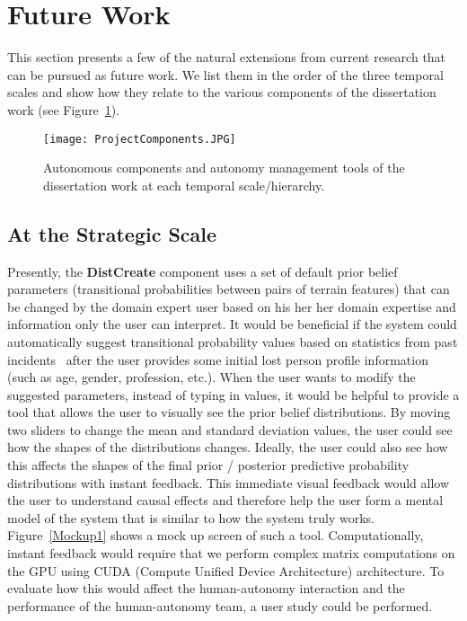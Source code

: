 \section{Future Work}
\label{futurework}

This section presents a few of the natural extensions from current research that can be pursued as future work. We list them in the order of the three temporal scales and show how they relate to the various components of the dissertation work (see Figure~\ref{ProjectComponents2}).

\begin{figure}
\centering
\texttt{[image: ProjectComponents.JPG]}
\caption{Autonomous components and autonomy management tools of the dissertation work at each temporal scale/hierarchy.}
\label{ProjectComponents2}
\end{figure}

\subsection{At the Strategic Scale}

Presently, the \textbf{DistCreate} component uses a set of default prior belief parameters (transitional probabilities between pairs of terrain features) that can be changed by the domain expert user based on his her her domain expertise and information only the user can interpret. It would be beneficial if the system could automatically suggest transitional probability values based on statistics from past incidents~\cite{Koester2008Lost} after the user provides some initial lost person profile information (such as age, gender, profession, etc.). When the user wants to modify the suggested parameters, instead of typing in values, it would be helpful to provide a tool that allows the user to visually see the prior belief distributions. By moving two sliders to change the mean and standard deviation values, the user could see how the shapes of the distributions changes. Ideally, the user could also see how this affects the shapes of the final prior / posterior predictive probability distributions with instant feedback. This immediate visual feedback would allow the user to understand causal effects and therefore help the user form a mental model of the system that is similar to how the system truly works. Figure~\ref{Mockup1} shows a mock up screen of such a tool. Computationally, instant feedback would require that we perform complex matrix computations on the GPU using CUDA (Compute Unified Device Architecture) architecture. To evaluate how this would affect the human-autonomy interaction and the performance of the human-autonomy team, a user study could be performed.

